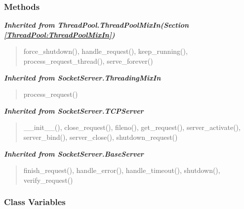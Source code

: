 
  \subsubsection{Methods}


\large{\textbf{\textit{Inherited from ThreadPool.ThreadPoolMixIn\textit{(Section \ref{ThreadPool:ThreadPoolMixIn})}}}}

\begin{quote}
force\_shutdown(), handle\_request(), keep\_running(), process\_request\_thread(), serve\_forever()
\end{quote}

\large{\textbf{\textit{Inherited from SocketServer.ThreadingMixIn}}}

\begin{quote}
process\_request()
\end{quote}

\large{\textbf{\textit{Inherited from SocketServer.TCPServer}}}

\begin{quote}
\_\_init\_\_(), close\_request(), fileno(), get\_request(), server\_activate(), server\_bind(), server\_close(), shutdown\_request()
\end{quote}

\large{\textbf{\textit{Inherited from SocketServer.BaseServer}}}

\begin{quote}
finish\_request(), handle\_error(), handle\_timeout(), shutdown(), verify\_request()
\end{quote}


  \subsubsection{Class Variables}

